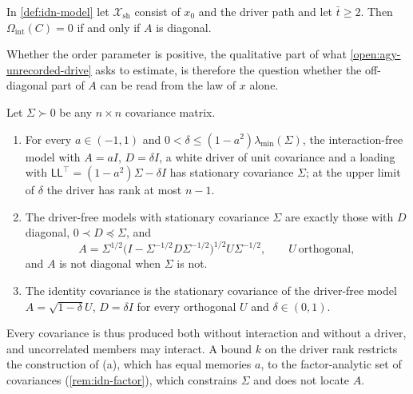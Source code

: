 \begin{proposition}\label{prop:idn-zero}
In \cref{def:idn-model} let $\mathcal X_{\mathrm{sh}}$ consist of $x_0$ and the driver path and let $\bar t\ge2$. Then $\Omega_{\mathrm{int}}(C)=0$ if and only if $A$ is diagonal.
\end{proposition}

Whether the order parameter is positive, the qualitative part of what \cref{open:agy-unrecorded-drive} asks to estimate, is therefore the question whether the off-diagonal part of $A$ can be read from the law of $x$ alone.

\begin{theorem}\label{thm:idn-covariance}
Let $\Sigma\succ0$ be any $n\times n$ covariance matrix.
\begin{enumerate}
\item[(a)] For every $a\in(-1,1)$ and $0<\delta\le(1-a^2)\lambda_{\min}(\Sigma)$, the interaction-free model with $A=aI$, $D=\delta I$, a white driver of unit covariance and a loading with $\mathsf L\mathsf L^{\top}=(1-a^2)\Sigma-\delta I$ has stationary covariance $\Sigma$; at the upper limit of $\delta$ the driver has rank at most $n-1$.
\item[(b)] The driver-free models with stationary covariance $\Sigma$ are exactly those with $D$ diagonal, $0\prec D\preceq\Sigma$, and
\begin{equation}\label{eq:idn-polar}
A=\Sigma^{1/2}\bigl(I-\Sigma^{-1/2}D\Sigma^{-1/2}\bigr)^{1/2}U\Sigma^{-1/2},\qquad U\ \text{orthogonal},
\end{equation}
and $A$ is not diagonal when $\Sigma$ is not.
\item[(c)] The identity covariance is the stationary covariance of the driver-free model $A=\sqrt{1-\delta}U$, $D=\delta I$ for every orthogonal $U$ and $\delta\in(0,1)$.
\end{enumerate}
\end{theorem}

Every covariance is thus produced both without interaction and without a driver, and uncorrelated members may interact. A bound $k$ on the driver rank restricts the construction of (a), which has equal memories $a$, to the factor-analytic set of covariances (\cref{rem:idn-factor}), which constrains $\Sigma$ and does not locate $A$.

